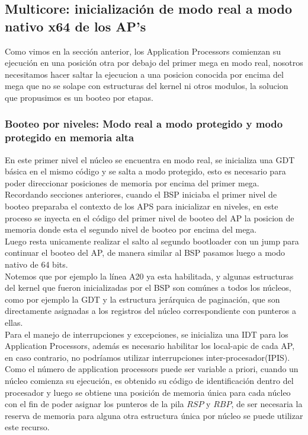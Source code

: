 \subsection{Multicore: inicialización de modo real a modo nativo x64 de los AP's}
    Como vimos en la sección anterior, los Application Processors comienzan su ejecución en una posición otra por debajo del primer mega en modo real, nosotros necesitamos hacer saltar la ejecucion a una posicion conocida por encima del mega que no se solape con estructuras del kernel ni otros modulos, la solucion que propusimos es un booteo por etapas.
    
    \subsubsection{Booteo por niveles: Modo real a modo protegido y modo protegido en memoria alta}
    En este primer nivel el núcleo se encuentra en modo real, se inicializa una GDT básica en el mismo código y se salta a modo protegido, esto es necesario para poder direccionar posiciones de memoria por encima del primer mega.\\

    Recordando secciones anteriores, cuando el BSP iniciaba el primer nivel de booteo preparaba el contexto de los APS para inicializar en niveles, en este proceso se inyecta en el código del primer nivel de booteo del AP la posicion de memoria donde esta el segundo nivel de booteo por encima del mega.\\

    Luego resta unicamente realizar el salto al segundo bootloader con un jump para continuar el booteo del AP, de manera similar al BSP pasamos luego a modo nativo de 64 bits.\\
    Notemos que por ejemplo la línea A20 ya esta habilitada, y algunas estructuras del kernel que fueron inicializadas por el BSP son comúnes a todos los núcleos, como por ejemplo la GDT y la estructura jerárquica de paginación,
    que son directamente asignadas a los registros del núcleo correspondiente con punteros a ellas.
    \\
    Para el manejo de interrupciones y excepciones, se inicializa una IDT para los Application Processors, además es necesario habilitar los local-apic de cada AP, en caso contrario, no podríamos utilizar interrupciones inter-procesador(IPIS).
    \\

    Como el número de application processors puede ser variable a priori, cuando un núcleo comienza su ejecución, es obtenido su código de identificación dentro del procesador y luego se obtiene una posición de memoria única para cada núcleo con el fin de poder asignar los punteros de la pila $RSP$ y $RBP$, de ser necesaria la reserva de memoria para alguna otra estructura única por núcleo se puede utilizar este recurso.